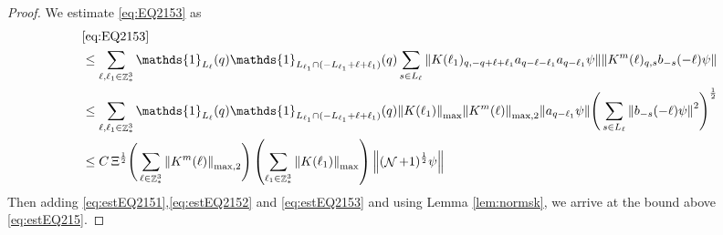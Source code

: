 \documentclass[sn-mathphys, Numbered ,a4paper]{sn-jnl}%
\DeclareMathOperator{\Z}{\mathbb{Z}}
\DeclareMathOperator{\NN}{\mathcal{N}}
\newcommand{\half}{\frac{1}{2}}
\theoremstyle{plain}
\theoremstyle{definition}
\theoremstyle{remark}
\theoremstyle{plain}
\theoremstyle{definition}
\theoremstyle{remark}
\begin{document}
\begin{proof}
We estimate \eqref{eq:EQ2153} as 
\begin{align}
	&\eqref{eq:EQ2153}\nonumber\\
	&\leq  \sum\limits_{\ell, \ell_1\in \Z^3_*} \mathds{1}_{L_{\ell}}(q) \mathds{1}_{L_{\ell_1}\cap (-L_{\ell_1}+\ell+\ell_1)}(q) \sum\limits_{ s \in L_{\ell}} \norm{K(\ell_1)_{q,-q+\ell+\ell_1} a_{q-\ell-\ell_1}  a_{q-\ell_1} \psi} \norm{ K^m(\ell)_{q,s}  b_{-s}(-\ell) \psi }\nonumber\\
	&\leq  \sum\limits_{\ell, \ell_1\in \Z^3_*} \mathds{1}_{L_{\ell}}(q) \mathds{1}_{L_{\ell_1}\cap (-L_{\ell_1}+\ell+\ell_1)}(q) \norm{K(\ell_1)}_{\mathrm{max}} \norm{K^m(\ell)}_{\mathrm{max,2}} \norm{  a_{q-\ell_1} \psi} \Bigg( \sum\limits_{ s \in L_{\ell}} \norm{ b_{-s}(-\ell) \psi }^2\Bigg)^\half\nonumber\\
	&\leq  C\, \Xi^\half \Bigg(\sum\limits_{\ell \in \Z^3_*}\norm{K^m(\ell)}_{\mathrm{max,2}}\Bigg) \left( \sum\limits_{\ell_1\in \Z^3_*} \norm{ K(\ell_1)}_{\mathrm{max}} \right) \norm{(\NN+1)^\half\psi}\label{eq:estEQ2153}
\end{align}
Then adding \eqref{eq:estEQ2151},\eqref{eq:estEQ2152} and \eqref{eq:estEQ2153} and using Lemma \ref{lem:normsk}, we arrive at the bound above \eqref{eq:estEQ215}.
\end{proof}
\end{document}
